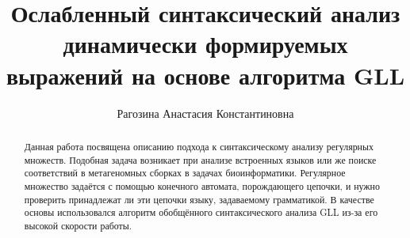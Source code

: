 \title{Ослабленный синтаксический анализ динамически формируемых выражений на основе алгоритма GLL}


\author{Рагозина Анастасия Константиновна}



\maketitle             

\begin{abstract}
Данная работа посвящена описанию подхода к синтаксическому анализу регулярных множеств. 
Подобная задача возникает при анализе встроенных языков или же поиске соответствий в 
метагеномных сборках в задачах биоинформатики. Регулярное множество задаётся с помощью 
конечного автомата, порождающего цепочки, и нужно проверить принадлежат ли эти цепочки 
языку, задаваемому грамматикой. В качестве основы использовался алгоритм обобщённого 
синтаксического анализа GLL из-за его высокой скорости работы.
\end{abstract}









